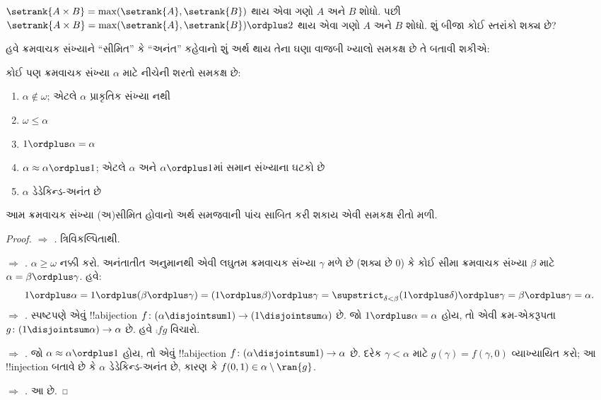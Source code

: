 \documentclass[../../../include/open-logic-section]{subfiles}
\begin{document}
\begin{prob}
$\setrank{A \times B}=
\max(\setrank{A}, \setrank{B})$ થાય એવા ગણો
$A$ અને $B$ શોધો. પછી
$\setrank{A \times B}=\max(\setrank{A}, \setrank{B}) \ordplus  2$
થાય એવા ગણો $A$ અને $B$ શોધો. શું બીજા કોઈ
સ્તરાંકો શક્ય છે?
\end{prob}

હવે ક્રમવાચક સંખ્યાને ``સીમિત'' કે ``અનંત'' કહેવાનો
શું અર્થ થાય તેના ઘણા વાજબી ખ્યાલો સમકક્ષ છે તે
બતાવી શકીએ:

\begin{lem}
કોઈ પણ ક્રમવાચક સંખ્યા $\alpha$ માટે નીચેની શરતો
સમકક્ષ છે:
\begin{enumerate}
	\item{} $\alpha\notin \omega$;
	એટલે $\alpha$ પ્રાકૃતિક સંખ્યા નથી
	\item{} $\omega \leq \alpha$
	\item{} $1 \ordplus  \alpha = \alpha$
	\item{} $\alpha \approx \alpha\ordplus 1$;
	એટલે $\alpha$ અને $\alpha\ordplus 1$માં
	સમાન સંખ્યાના ઘટકો છે
	\item{} $\alpha$ ડેડેકિન્ડ-અનંત છે
	\end{enumerate}
\end{lem}
\noindent
આમ ક્રમવાચક સંખ્યા (અ)સીમિત હોવાનો અર્થ સમજવાની
પાંચ સાબિત કરી શકાય એવી સમકક્ષ રીતો મળી.

\begin{proof}
\emph{ $\Rightarrow$ .}
ત્રિવિકલ્પિતાથી.

\emph{ $\Rightarrow$ .}
$\alpha \geq \omega$ નક્કી કરો. અનંતાતીત અનુમાનથી
એવી લઘુતમ ક્રમવાચક સંખ્યા $\gamma$ મળે છે
(શક્ય છે $0$) કે કોઈ સીમા ક્રમવાચક સંખ્યા $\beta$
માટે $\alpha = \beta \ordplus \gamma$. હવે:
\[
	1 \ordplus \alpha =
	1 \ordplus (\beta \ordplus \gamma) =
	(1 \ordplus \beta) \ordplus \gamma =
	\supstrict_{\delta < \beta} (1 \ordplus  \delta) \ordplus  \gamma =
	\beta \ordplus  \gamma =
	\alpha.
\]
\emph{ $\Rightarrow$ .}
સ્પષ્ટપણે એવું !!a{bijection}
$f \colon (\alpha \disjointsum 1) \to (1
\disjointsum \alpha)$ છે. જો $1 \ordplus \alpha = \alpha$
હોય, તો એવી ક્રમ-એકરૂપતા
$g \colon (1 \disjointsum \alpha) \to \alpha$
છે. હવે $\comp{f}{g}$ વિચારો.

\emph{ $\Rightarrow$ .}
જો $\alpha \approx \alpha \ordplus 1$ હોય, તો એવું
!!a{bijection} $f \colon
(\alpha \disjointsum 1) \to \alpha$ છે. દરેક
$\gamma < \alpha$ માટે $g(\gamma) = f(\gamma, 0)$
વ્યાખ્યાયિત કરો; આ !!{injection} બતાવે છે કે
$\alpha$ ડેડેકિન્ડ-અનંત છે, કારણ કે
$f(0,1) \in \alpha \setminus \ran{g}$.

\emph{ $\Rightarrow$ .}
આ  છે.
\end{proof}
\end{document}
